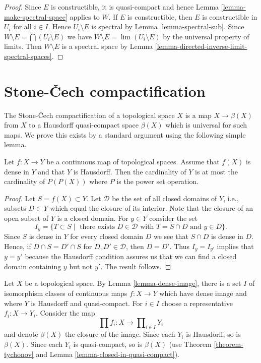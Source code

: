 \begin{proof}
Since $E$ is constructible, it is quasi-compact and hence
Lemma \ref{lemma-make-spectral-space} applies to $W$.
If $E$ is constructible, then $E$ is constructible in $U_i$
for all $i \in I$. Hence $U_i \setminus E$
is spectral by Lemma \ref{lemma-spectral-sub}.
Since $W \setminus E = \bigcap (U_i \setminus E)$ we have
$W \setminus E = \lim (U_i \setminus E)$ by the universal property of limits.
Then $W \setminus E$ is a spectral space by
Lemma \ref{lemma-directed-inverse-limit-spectral-spaces}.
\end{proof}






\section{Stone-{\v C}ech compactification}
\label{section-stone-cech}

\noindent
The Stone-{\v C}ech compactification of a topological space $X$
is a map $X \to \beta(X)$ from $X$ to a Hausdorff quasi-compact space
$\beta(X)$ which is universal for such maps. We prove this exists
by a standard argument using the following simple lemma.

\begin{lemma}
\label{lemma-dense-image}
Let $f : X \to Y$ be a continuous map of topological spaces. Assume that
$f(X)$ is dense in $Y$ and that $Y$ is Hausdorff. Then the cardinality
of $Y$ is at most the cardinality of $P(P(X))$ where $P$ is the power
set operation.
\end{lemma}

\begin{proof}
Let $S = f(X) \subset Y$. Let $\mathcal{D}$ be the set of all
closed domains of $Y$, i.e., subsets $D \subset Y$ which
equal the closure of its interior. Note that the closure of an
open subset of $Y$ is a closed domain. For $y \in Y$ consider the set
$$
I_y = \{T \subset S \mid \text{ there exists }
D \in \mathcal{D}\text{ with }T = S \cap D\text{ and }y \in D\}.
$$
Since $S$ is dense in $Y$ for every closed domain $D$ we see
that $S \cap D$ is dense in $D$. Hence, if
$D \cap S = D' \cap S$ for $D, D' \in \mathcal{D}$, then
$D = D'$. Thus $I_y = I_{y'}$ implies that $y = y'$ because the
Hausdorff condition assures us that we can find a closed domain
containing $y$ but not $y'$. The result follows.
\end{proof}

\noindent
Let $X$ be a topological space. By Lemma \ref{lemma-dense-image}, there
is a set $I$
of isomorphism classes of continuous maps $f : X \to Y$ which have dense
image and where $Y$ is Hausdorff and quasi-compact. For $i \in I$ choose a
representative $f_i : X \to Y_i$. Consider the map
$$
\prod f_i : X \longrightarrow \prod\nolimits_{i \in I} Y_i
$$
and denote $\beta(X)$ the closure of the image. Since each $Y_i$ is
Hausdorff, so is $\beta(X)$. Since each $Y_i$ is quasi-compact, so
is $\beta(X)$ (use Theorem \ref{theorem-tychonov} and
Lemma \ref{lemma-closed-in-quasi-compact}).

